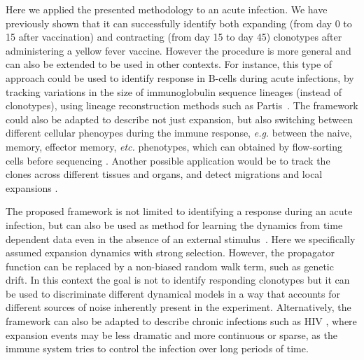 Here we applied the presented methodology to an acute infection. We have previously shown that it can successfully identify both expanding (from day 0 to 15 after vaccination) and contracting (from day 15 to day 45) clonotypes after administering a yellow fever vaccine. However the procedure is more general and can also be extended to be used in other contexts. For instance, this type of approach could be used to identify response in B-cells during acute infections, by tracking variations in the size of immunoglobulin sequence lineages (instead of clonotypes), using lineage reconstruction methods such as Partis~\cite{Ralph2016a}.
The framework could also be adapted to describe not just expansion, but also switching between different cellular phenoypes during the immune response, {\em e.g.} between the naive, memory, effector memory, {\em etc.} phenotypes, which can obtained by flow-sorting cells before sequencing \cite{Minervina2019}. Another possible application would be to track the clones across different tissues and organs, and detect migrations and local expansions \cite{Kadoki2017}.

The proposed framework is not limited to identifying a response during an acute infection, but can also be used as method for learning the dynamics from time dependent data even in the absence of an external stimulus~\cite{Chu2019}. Here we specifically assumed expansion dynamics with strong selection. However, the propagator function can be replaced by a non-biased random walk term, such as genetic drift. In this context the goal is not to identify responding clonotypes but it can be used to discriminate different dynamical models in a way that accounts for different sources of noise inherently present in the experiment. Alternatively, the framework can also be adapted to describe chronic infections such as HIV \cite{Nourmohammad2019}, where expansion events may be less dramatic and more continuous or sparse, as the immune system tries to control the infection over long periods of time.


